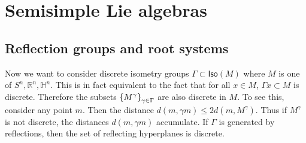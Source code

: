 \documentclass[leqno, openany]{memoir}
\theoremstyle{definition}
\theoremstyle{remark}
\theoremstyle{plain}
\theoremstyle{definition}
\theoremstyle{remark}
\newcommand{\R}{\mathbb{R}}
\renewcommand{\H}{\mathbb{H}}
\begin{document}
\chapter{Semisimple Lie algebras}%
\label{cha:semisimple_lie_algebras-2}

\section{Reflection groups and root systems}%
\label{sec:reflection_groups}

Now we want to consider discrete isometry groups $\Gamma \subset \mathsf{Iso}(M)$ where $M$ is one of $S^n, \R^n, \H^n$. This is in fact equivalent to the fact that for all $x \in M$, $\Gamma x \subset M$ is discrete. Therefore the subsets $\qty{M^{\gamma}}_{\gamma \in \Gamma}$ are also discrete in $M$. To see this, consider any point $m$. Then the distance $d(m, \gamma m) \leq 2 d(m, M^{\gamma})$. Thus if $M^{\gamma}$ is not discrete, the distances $d(m, \gamma m)$ accumulate. If $\Gamma$ is generated by reflections, then the set of reflecting hyperplanes is discrete.
\end{document}
